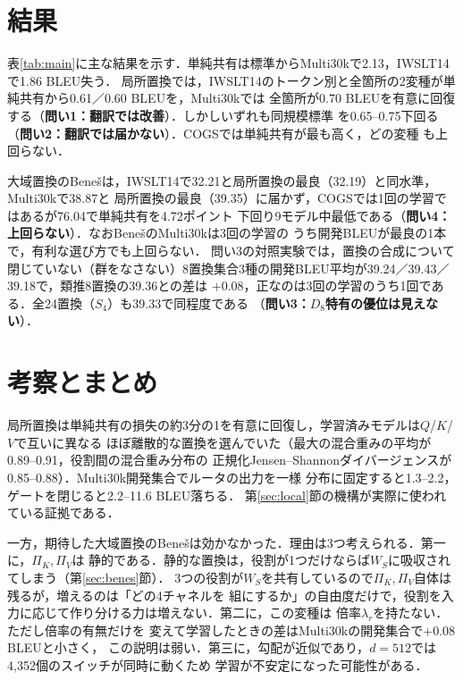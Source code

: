 \documentclass{nlp2026}
\begin{document}
\section{結果}
\label{sec:results}

表\ref{tab:main}に主な結果を示す．単純共有は標準からMulti30kで2.13，IWSLT14で1.86 BLEU失う．
局所置換では，IWSLT14のトークン別と全箇所の2変種が単純共有から0.61／0.60 BLEUを，Multi30kでは
全箇所が0.70 BLEUを有意に回復する（\textbf{問い1：翻訳では改善}）．しかしいずれも同規模標準
を0.65--0.75下回る（\textbf{問い2：翻訳では届かない}）．COGSでは単純共有が最も高く，どの変種
も上回らない．

大域置換のBenešは，IWSLT14で32.21と局所置換の最良（32.19）と同水準，Multi30kで38.87と
局所置換の最良（39.35）に届かず，COGSでは1回の学習ではあるが76.04で単純共有を4.72ポイント
下回り9モデル中最低である（\textbf{問い4：上回らない}）．なおBenešのMulti30kは3回の学習の
うち開発BLEUが最良の1本で，有利な選び方でも上回らない．
問い3の対照実験では，置換の合成について閉じていない（群をなさない）8置換集合3種の開発BLEU平均が39.24／39.43／39.18で，類推8置換の39.36との差は
$+0.08$，正なのは3回の学習のうち1回である．全24置換（$S_4$）も39.33で同程度である
（\textbf{問い3：$D_8$特有の優位は見えない}）．

\section{考察とまとめ}
\label{sec:discussion}

局所置換は単純共有の損失の約3分の1を有意に回復し，学習済みモデルは$Q$/$K$/$V$で互いに異なる
ほぼ離散的な置換を選んでいた（最大の混合重みの平均が0.89--0.91，役割間の混合重み分布の
正規化Jensen--Shannonダイバージェンスが0.85--0.88）．Multi30k開発集合でルータの出力を一様
分布に固定すると1.3--2.2，ゲートを閉じると2.2--11.6 BLEU落ちる．
第\ref{sec:local}節の機構が実際に使われている証拠である．

一方，期待した大域置換のBenešは効かなかった．理由は3つ考えられる．第一に，$\Pi_K,\Pi_V$は
静的である．静的な置換は，役割が1つだけならば$W_S$に吸収されてしまう（第\ref{sec:benes}節）．
3つの役割が$W_S$を共有しているので$\Pi_K,\Pi_V$自体は残るが，増えるのは「どの4チャネルを
組にするか」の自由度だけで，役割を入力に応じて作り分ける力は増えない．第二に，この変種は
倍率$\lambda_r$を持たない．ただし倍率の有無だけを
変えて学習したときの差はMulti30kの開発集合で$+0.08$ BLEUと小さく，
この説明は弱い．第三に，勾配が近似であり，$d=512$では4,352個のスイッチが同時に動くため
学習が不安定になった可能性がある．
\end{document}

